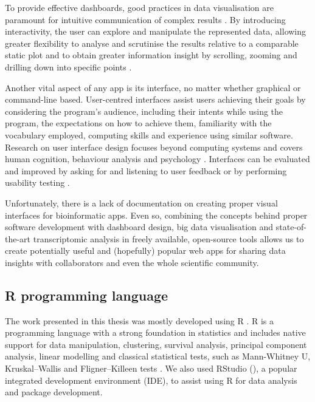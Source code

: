 To provide effective dashboards, good practices in data visualisation are paramount for intuitive communication of complex results \cite{tidwell:2019tf}. By introducing interactivity, the user can explore and manipulate the represented data, allowing greater flexibility to analyse and scrutinise the results relative to a comparable static plot and to obtain greater information insight by scrolling, zooming and drilling down into specific points \cite{tidwell:2019tf}.

Another vital aspect of any app is its interface, no matter whether graphical or command-line based. User-centred interfaces assist users achieving their goals by considering the program's audience, including their intents while using the program, the expectations on how to achieve them, familiarity with the vocabulary employed, computing skills and experience using similar software. Research on user interface design focuses beyond computing systems and covers human cognition, behaviour analysis and psychology \cite{silva:2017wl,hewitt:2019uj,tidwell:2019tf,alves:2020vu}. Interfaces can be evaluated and improved by asking for and listening to user feedback or by performing usability testing \cite{tidwell:2019tf}.

Unfortunately, there is a lack of documentation on creating proper visual interfaces for bioinformatic apps. Even so, combining the concepts behind proper software development with dashboard design, big data visualisation and state-of-the-art transcriptomic analysis in freely available, open-source tools allows us to create potentially useful and (hopefully) popular web apps for sharing data insights with collaborators and even the whole scientific community.

\subsection{R programming language}

The work presented in this thesis was mostly developed using R \cite{r-core-team:2021wf}. R is a programming language with a strong foundation in statistics and includes native support for data manipulation, clustering, survival analysis, principal component analysis, linear modelling and classical statistical tests, such as Mann-Whitney U, Kruskal–Wallis and Fligner–Killeen tests \cite{r-core-team:2021wf,therneau:2000tk}. We also used RStudio (), a popular integrated development environment (IDE), to assist using R for data analysis and package development.

